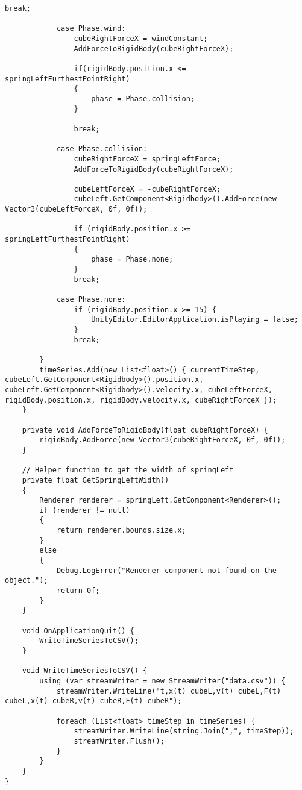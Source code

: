 \documentclass{article}
\begin{document}
\begin{lstlisting}[caption={CubeRightController.cs}, label={CubeRightController}, basicstyle=\ttfamily\small]
                break;

            case Phase.wind:
                cubeRightForceX = windConstant;
                AddForceToRigidBody(cubeRightForceX);

                if(rigidBody.position.x <= springLeftFurthestPointRight)
                {
                    phase = Phase.collision;
                }

                break;

            case Phase.collision:
                cubeRightForceX = springLeftForce;
                AddForceToRigidBody(cubeRightForceX);

                cubeLeftForceX = -cubeRightForceX;
                cubeLeft.GetComponent<Rigidbody>().AddForce(new Vector3(cubeLeftForceX, 0f, 0f));

                if (rigidBody.position.x >= springLeftFurthestPointRight)
                {
                    phase = Phase.none;
                }
                break;

            case Phase.none:
                if (rigidBody.position.x >= 15) {
                    UnityEditor.EditorApplication.isPlaying = false;
                }
                break;

        }
        timeSeries.Add(new List<float>() { currentTimeStep, cubeLeft.GetComponent<Rigidbody>().position.x, cubeLeft.GetComponent<Rigidbody>().velocity.x, cubeLeftForceX, rigidBody.position.x, rigidBody.velocity.x, cubeRightForceX });
    }

    private void AddForceToRigidBody(float cubeRightForceX) {
        rigidBody.AddForce(new Vector3(cubeRightForceX, 0f, 0f));
    }

    // Helper function to get the width of springLeft
    private float GetSpringLeftWidth()
    {
        Renderer renderer = springLeft.GetComponent<Renderer>();
        if (renderer != null)
        {
            return renderer.bounds.size.x;
        }
        else
        {
            Debug.LogError("Renderer component not found on the object.");
            return 0f;
        }
    }

    void OnApplicationQuit() {
        WriteTimeSeriesToCSV();
    }

    void WriteTimeSeriesToCSV() {
        using (var streamWriter = new StreamWriter("data.csv")) {
            streamWriter.WriteLine("t,x(t) cubeL,v(t) cubeL,F(t) cubeL,x(t) cubeR,v(t) cubeR,F(t) cubeR");
            
            foreach (List<float> timeStep in timeSeries) {
                streamWriter.WriteLine(string.Join(",", timeStep));
                streamWriter.Flush();
            }
        }
    }
}
\end{lstlisting}
\end{document}
